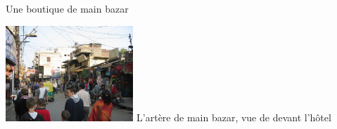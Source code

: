 \begin{multicols}{2}
Une boutique de main bazar

\hspace*{-0.65cm}
\includegraphics[width=4.8cm]{articles/Arrivee-en-inde/rue.jpg}
L'artère de main bazar, vue de devant l'hôtel

\end{multicols}

